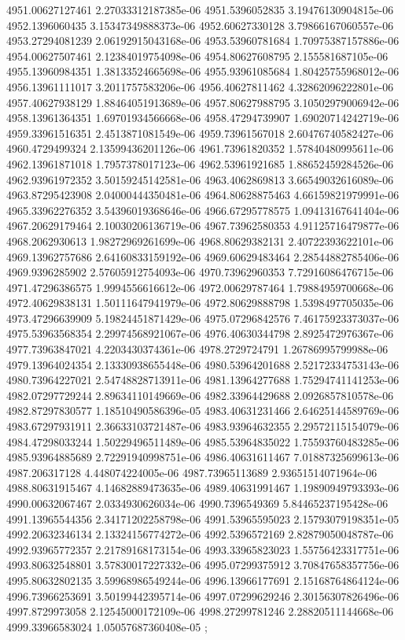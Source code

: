 {4951.00627127461 2.27033312187385e-06
4951.5396052835 3.19476130904815e-06
4952.1396060435 3.15347349888373e-06
4952.60627330128 3.79866167060557e-06
4953.27294081239 2.06192915043168e-06
4953.53960781684 1.70975387157886e-06
4954.00627507461 2.12384019754098e-06
4954.80627608795 2.155581687105e-06
4955.13960984351 1.38133524665698e-06
4955.93961085684 1.80425755968012e-06
4956.13961111017 3.2011757583206e-06
4956.40627811462 4.32862096222801e-06
4957.40627938129 1.88464051913689e-06
4957.80627988795 3.10502979006942e-06
4958.13961364351 1.69701934566668e-06
4958.47294739907 1.69020714242719e-06
4959.33961516351 2.4513871081549e-06
4959.73961567018 2.60476740582427e-06
4960.4729499324 2.13599436201126e-06
4961.73961820352 1.57840480995611e-06
4962.13961871018 1.7957378017123e-06
4962.53961921685 1.88652459284526e-06
4962.93961972352 3.50159245142581e-06
4963.4062869813 3.66549032616089e-06
4963.87295423908 2.04000444350481e-06
4964.80628875463 4.66159821979991e-06
4965.33962276352 3.54396019368646e-06
4966.67295778575 1.09413167641404e-06
4967.20629179464 2.10030206136719e-06
4967.73962580353 4.91125716479877e-06
4968.2062930613 1.98272969261699e-06
4968.80629382131 2.40722393622101e-06
4969.13962757686 2.64160833159192e-06
4969.60629483464 2.28544882785406e-06
4969.9396285902 2.57605912754093e-06
4970.73962960353 7.72916086476715e-06
4971.47296386575 1.9994556616612e-06
4972.00629787464 1.79884959700668e-06
4972.40629838131 1.50111647941979e-06
4972.80629888798 1.5398497705035e-06
4973.47296639909 5.19824451871429e-06
4975.07296842576 7.46175923373037e-06
4975.53963568354 2.29974568921067e-06
4976.40630344798 2.8925472976367e-06
4977.73963847021 4.2203430374361e-06
4978.2729724791 1.26786995799988e-06
4979.13964024354 2.13330938655448e-06
4980.53964201688 2.52172334753143e-06
4980.73964227021 2.54748828713911e-06
4981.13964277688 1.75294741141253e-06
4982.07297729244 2.89634110149669e-06
4982.33964429688 2.0926857810578e-06
4982.87297830577 1.18510490586396e-05
4983.40631231466 2.64625144589769e-06
4983.67297931911 2.36633103721487e-06
4983.93964632355 2.29572115154079e-06
4984.47298033244 1.50229496511489e-06
4985.53964835022 1.75593760483285e-06
4985.93964885689 2.72291940998751e-06
4986.40631611467 7.01887325699613e-06
4987.206317128 4.448074224005e-06
4987.73965113689 2.93651514071964e-06
4988.80631915467 4.14682889473635e-06
4989.40631991467 1.19890949793393e-06
4990.00632067467 2.0334930626034e-06
4990.7396549369 5.84465237195428e-06
4991.13965544356 2.34171202258798e-06
4991.53965595023 2.15793079198351e-05
4992.20632346134 2.13324156774272e-06
4992.5396572169 2.82879050048787e-06
4992.93965772357 2.21789168173154e-06
4993.33965823023 1.55756423317751e-06
4993.80632548801 3.57830017227332e-06
4995.07299375912 3.70847658357756e-06
4995.80632802135 3.59968986549244e-06
4996.13966177691 2.15168764864124e-06
4996.73966253691 3.50199442395714e-06
4997.07299629246 2.30156307826496e-06
4997.8729973058 2.12545000172109e-06
4998.27299781246 2.28820511144668e-06
4999.33966583024 1.05057687360408e-05
};